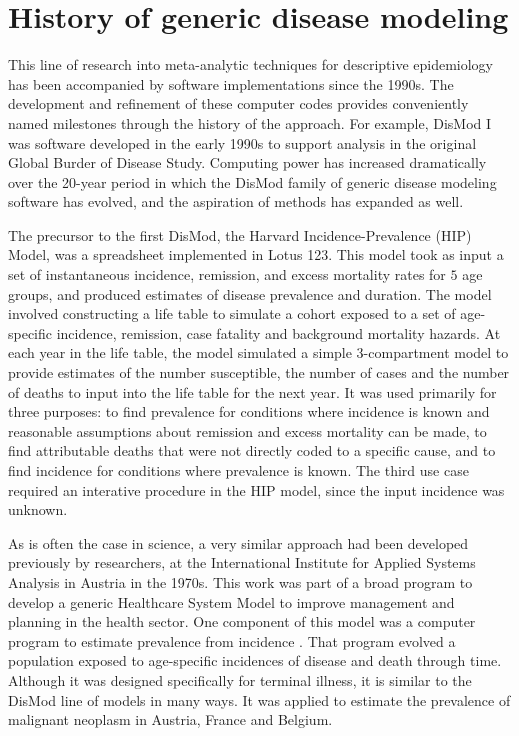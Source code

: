 \section{History of generic disease modeling}

This line of research into meta-analytic techniques for descriptive
epidemiology has been accompanied by software implementations since
the 1990s.  The development and refinement of these computer codes
provides conveniently named milestones through the history of the
approach.  For example, DisMod I was software developed in the early
1990s to support analysis in the original Global Burder of Disease
Study.  Computing power has increased dramatically over the 20-year
period in which the DisMod family of generic disease modeling software
has evolved, and the aspiration of methods has expanded as well.

The precursor to the first DisMod, the Harvard Incidence-Prevalence
(HIP) Model, was a spreadsheet implemented in Lotus 123.
\cite{Murray_Quantifying_1994} This model took as input a set of
instantaneous incidence, remission, and excess mortality rates for $5$
age groups, and produced estimates of disease prevalence and duration.
The model involved constructing a life table to simulate a cohort
exposed to a set of age-specific incidence, remission, case fatality
and background mortality hazards. At each year in the life table, the
model simulated a simple 3-compartment model to provide estimates of
the number susceptible, the number of cases and the number of deaths
to input into the life table for the next year.  It was used primarily
for three purposes: to find prevalence for conditions where incidence
is known and reasonable assumptions about remission and excess
mortality can be made, to find attributable deaths that were not
directly coded to a specific cause, and to find incidence for
conditions where prevalence is known.  The third use case required an
interative procedure in the HIP model, since the input incidence was
unknown.

As is often the case in science, a very similar approach had been
developed previously by researchers, at the International Institute
for Applied Systems Analysis in Austria in the 1970s. This work was
part of a broad program to develop a generic Healthcare System Model
to improve management and planning in the health sector. One component
of this model was a computer program to estimate prevalence from
incidence \cite{Klementiev_On_1977}. That program evolved a population
exposed to age-specific incidences of disease and death through time.
Although it was designed specifically for terminal illness, it is
similar to the DisMod line of models in many ways. It was applied to
estimate the prevalence of malignant neoplasm in Austria, France and
Belgium.


